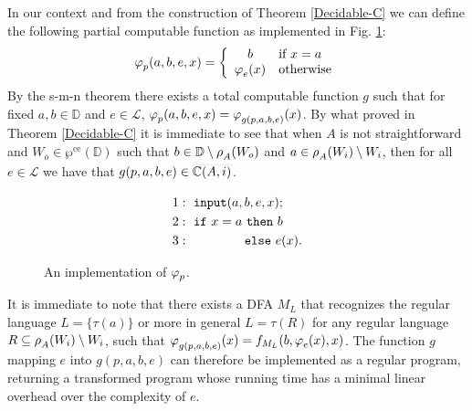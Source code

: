 \documentclass[runningheads]{llncs}
\def\ok#1{\mbox{\raisebox{0ex}[1ex][1ex]{$#1$}}}
\def\wpre{\wp^{\text{ce}}}
\def\bbbc{{\mathbb{C}}}
\newcommand{\ccL}{\mathscr{L}}
\newcommand{\Domain}{\mathbb{D}}
\newcommand{\pfunction}[3]{\ok{\varphi^{#2\, #3}_{#1}}}
\newcommand{\auco}[2]{\ok{\rho^{#1}_{#2}}}
\newcommand{\compl}[1]{\ok{\overline{#1}}}
\def\ok#1{\mbox{\raisebox{0ex}[1ex][1ex]{$#1$}}}
\def\cAA{\ensuremath{A}}
\begin{document}
%
In our context and from the construction of Theorem \ref{Decidable-C} we can define the following partial computable function as implemented in Fig. \ref{code3}:
\[
\pfunction{p}{}{}(a,b,e,x)=\left\{
\begin{array}{cl}
b & \mbox{if $x=a$}\\
\pfunction{e}{}{}(x) &\mbox{otherwise}
\end{array}\right .
\]
By the s-m-n theorem there exists a total computable function $g$ such that for fixed $a,b\in\Domain$ and $e\in\ccL$, $\pfunction{p}{}{}(a,b,e,x) = \pfunction{g(p,a,b,e)}{}{}(x)$. By what proved in Theorem \ref{Decidable-C} it is immediate to see that when $\cAA$ is not straightforward and $W_o\in\wpre(\Domain)$ such that $b\in\Domain\setminus\auco{}{A}(W_o)$ and $a\in \auco{}{A}(W_i)\setminus W_i$, then for all $e\in\ccL$ we have that $g(p,a,b,e)\in \compl{\bbbc(\cAA,i)}$. 
\begin{figure}[t]
    \begin{align*}
    &1:~{\tt input}(a,b,e,x);\\
    &2:~{\tt if}\ x = a\ {\tt then}\ b\\
    &3:~\qquad\qquad {\tt else}\ e(x).
    \end{align*}
    \caption{An implementation of $\pfunction{p}{}{}$.}\label{code3}
    \end{figure}
It is immediate to note that there exists a DFA $M_{L}$ that recognizes the regular language  $L=\{\tau(a)\}$ or more in general $L=\tau(R)$ for any regular language $R\subseteq \auco{}{\cAA}(W_i)\setminus W_i$, such that 
$\pfunction{g(p,a,b,e)}{}{}(x)= f_{M_{L}}(b,\pfunction{e}{}{}(x),x)$. The function $g$ mapping $e$ into $g(p,a,b,e)$ can therefore be implemented as a regular program, returning a transformed program whose running time has a minimal linear overhead over the complexity of $e$.
\end{document}
